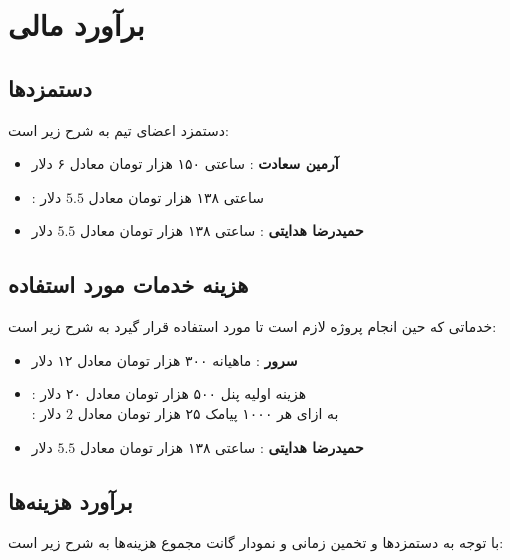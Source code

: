 \section{برآورد مالی}
\subsection{دستمزدها}
دستمزد اعضای تیم به شرح زیر است:
\begin{itemize}
	\item 
	\textbf{آرمین سعادت}
	: ساعتی ۱۵۰ هزار تومان معادل ۶ دلار
	\item 
	: ساعتی ۱۳۸ هزار تومان معادل 
	$5.5$
	دلار
	\item 
	\textbf{حمیدرضا هدایتی}
	: ساعتی ۱۳۸ هزار تومان معادل 
	$5.5$
	دلار
\end{itemize}

\subsection{هزینه خدمات مورد استفاده}
خدماتی که حین انجام پروژه لازم است تا مورد استفاده قرار گیرد به شرح زیر است:
\begin{itemize}
	\item 
	\textbf{سرور}
	: ماهیانه ۳۰۰ هزار تومان معادل ۱۲ دلار
	\item 
	:
	هزینه اولیه پنل ۵۰۰ هزار تومان معادل ۲۰ دلار
	\\
	: به ازای هر ۱۰۰۰ پیامک ۲۵ هزار تومان معادل 
	$2$
	دلار
	\item 
	\textbf{حمیدرضا هدایتی}
	: ساعتی ۱۳۸ هزار تومان معادل 
	$5.5$
	دلار
\end{itemize}

\subsection{برآورد هزینه‌ها}
با توجه به دستمزد‌ها و تخمین زمانی و نمودار گانت مجموع هزینه‌ها به شرح زیر است:

